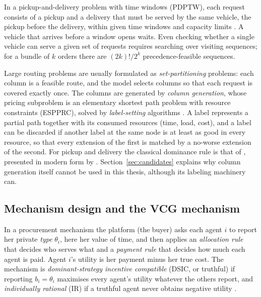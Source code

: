 In a pickup-and-delivery problem with time windows (PDPTW), each request
consists of a pickup and a delivery that must be served by the same vehicle,
the pickup before the delivery, within given time windows and capacity
limits \citep{dumas1991pickup}. A vehicle that arrives before a window
opens waits. Even checking whether a single vehicle can serve a given set of
requests requires searching over visiting sequences; for a bundle of $k$
orders there are $(2k)!/2^k$ precedence-feasible sequences.

Large routing problems are usually formulated as \emph{set-partitioning}
problems: each column is a feasible route, and the model selects columns so
that each request is covered exactly once. The columns are generated by
\emph{column generation}, whose pricing subproblem is an elementary shortest
path problem with resource constraints (ESPPRC), solved by \emph{label-setting}
algorithms \citep{lubbecke2005selected,feillet2004exact}. A label represents
a partial path together with its consumed resources (time, load, cost), and
a label can be discarded if another label at the same node is at least as
good in every resource, so that every extension of the first is matched by a
no-worse extension of the second. For pickup and delivery the classical
dominance rule is that of \citet{dumas1991pickup}, presented in modern form
by \citet{gschwind2018bidirectional}. Section~\ref{sec:candidates} explains
why column generation itself cannot be used in this thesis, although its
labeling machinery can.

\subsection{Mechanism design and the VCG mechanism}

In a procurement mechanism the platform (the buyer) asks each agent $i$ to
report her private \emph{type} $\theta_i$, here her value of time, and then
applies an \emph{allocation rule} that decides who serves what and a
\emph{payment rule} that decides how much each agent is paid. Agent $i$'s
utility is her payment minus her true cost. The mechanism is
\emph{dominant-strategy incentive compatible} (DSIC, or truthful) if
reporting $b_i=\theta_i$ maximises every agent's utility whatever the others
report, and \emph{individually rational} (IR) if a truthful agent never
obtains negative utility \citep{nisan2007agt}.

